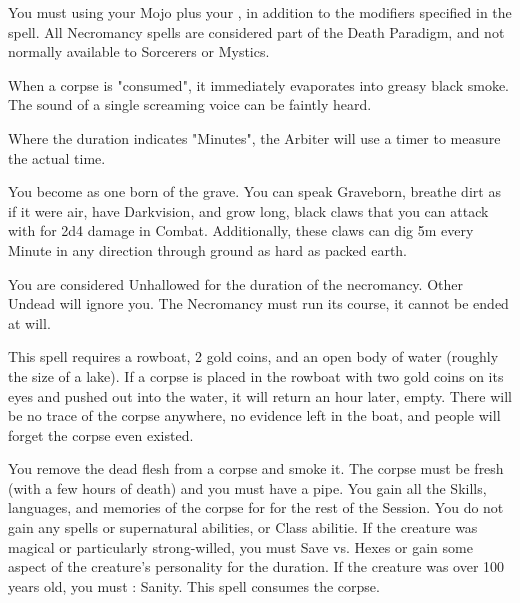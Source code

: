 {\newpage



You must \RO using your Mojo \UD plus your \FOC, in addition to the modifiers specified in the spell.  All Necromancy spells are considered part of the Death Paradigm, and not normally available to Sorcerers or Mystics.




When a corpse is "consumed", it immediately evaporates into greasy black smoke.  The sound of a single screaming voice can be faintly heard.

Where the duration indicates "\LVL Minutes", the Arbiter will use a timer to measure the actual time.


\NECRO[
  Name=Born of the Grave,
  Link=necromancy-born-of-the-grave,
  Paradigm=Death,
  Save=N,
  Duration=Combat or \LVL Minutes,
  Mod=+3,
  Keywords=None,
  Target=Self
]


You become as one born of the grave.  You can speak Graveborn, breathe dirt as if it were air, have Darkvision, and grow long, black claws that you can attack with for 2d4 damage in Combat.  Additionally, these claws can dig 5m every Minute in any direction through ground as hard as packed earth.  

You are considered Unhallowed for the duration of the necromancy.  Other Undead will ignore you.  The Necromancy must run its course, it cannot be ended at will.

\cbreak

\NECRO[
  Name=Charon's Price,
  Link=necromancy-charon-price,
  Paradigm=Death,
  Save=N,
  Duration=0,
  Mod=+6,
  Keywords=None,
  Target=Corpse in a boat
]


This spell requires a rowboat, 2 gold coins, and an open body of water (roughly the size of a lake).  If a corpse is placed in the rowboat with two gold coins on its eyes and pushed out into the water, it will return an hour later, empty. There will be no trace of the corpse anywhere, no evidence left in the boat, and people will forget the corpse even existed.

\NECRO[
  Name=Corpse Smoke,
  Link=necromancy-corpse-smoke,
  Paradigm=Death,
  Save=N,
  Duration=0,
  Mod=+3,
  Keywords=None,
  Target=Close (touch) Mortal corpse
]


You remove the dead flesh from a corpse and smoke it.  The corpse must be fresh (with a few hours of death) and you must have a pipe.   You gain all the Skills, languages, and memories of the corpse for for the rest of the Session.  You do not gain any spells or supernatural abilities, or Class abilitie. If the creature was magical or particularly strong-willed, you must Save vs. Hexes or gain some aspect of the creature's personality for the duration. If the creature was over 100 years old, you must \RS : Sanity.  This spell consumes the corpse.

}
